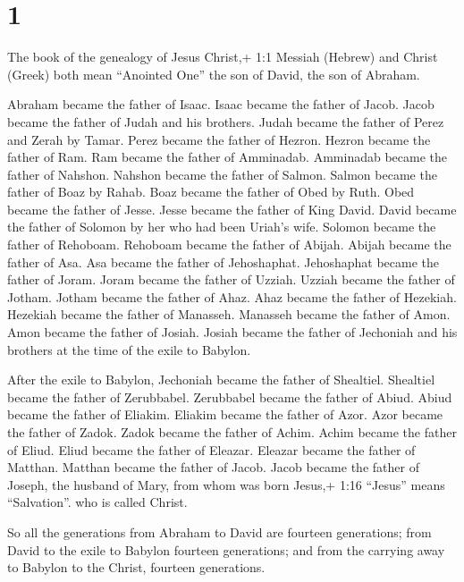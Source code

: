 \hypertarget{section}{%
\section{1}\label{section}}

 The book of the genealogy of Jesus Christ,+ 1:1 Messiah
(Hebrew) and Christ (Greek) both mean ``Anointed One'' the son of David,
the son of Abraham.

 Abraham became the father of Isaac. Isaac became the father
of Jacob. Jacob became the father of Judah and his brothers.
 Judah became the father of Perez and Zerah by Tamar. Perez
became the father of Hezron. Hezron became the father of Ram.
 Ram became the father of Amminadab. Amminadab became the
father of Nahshon. Nahshon became the father of Salmon. 
Salmon became the father of Boaz by Rahab. Boaz became the father of
Obed by Ruth. Obed became the father of Jesse.  Jesse became
the father of King David. David became the father of Solomon by her who
had been Uriah's wife.  Solomon became the father of
Rehoboam. Rehoboam became the father of Abijah. Abijah became the father
of Asa.  Asa became the father of Jehoshaphat. Jehoshaphat
became the father of Joram. Joram became the father of Uzziah.
 Uzziah became the father of Jotham. Jotham became the
father of Ahaz. Ahaz became the father of Hezekiah. 
Hezekiah became the father of Manasseh. Manasseh became the father of
Amon. Amon became the father of Josiah.  Josiah became the
father of Jechoniah and his brothers at the time of the exile to
Babylon.

 After the exile to Babylon, Jechoniah became the father of
Shealtiel. Shealtiel became the father of Zerubbabel. 
Zerubbabel became the father of Abiud. Abiud became the father of
Eliakim. Eliakim became the father of Azor.  Azor became
the father of Zadok. Zadok became the father of Achim. Achim became the
father of Eliud.  Eliud became the father of Eleazar.
Eleazar became the father of Matthan. Matthan became the father of
Jacob.  Jacob became the father of Joseph, the husband of
Mary, from whom was born Jesus,+ 1:16 ``Jesus'' means ``Salvation''. who
is called Christ.

 So all the generations from Abraham to David are fourteen
generations; from David to the exile to Babylon fourteen generations;
and from the carrying away to Babylon to the Christ, fourteen
generations.


